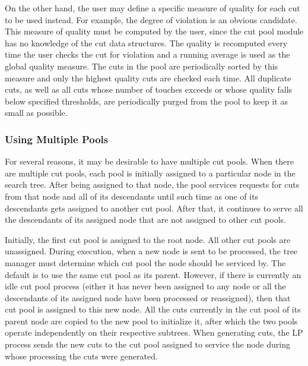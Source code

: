 On the other hand, the user may define a specific measure of quality for
each cut to be used instead. For example, the degree of
violation is an obvious candidate. This measure of quality must be
computed by the user, since the cut pool module has no knowledge of
the cut data structures. The quality is recomputed every time
the user checks the cut for violation and a running average is used as
the global quality measure. The cuts in the pool are periodically
sorted by this measure and only the highest quality cuts
are checked each time. All duplicate cuts, as well as all cuts whose
number of touches exceeds or whose quality falls below specified
thresholds, are periodically purged from the pool to keep it as small as
possible.

\subsubsection{Using Multiple Pools}
\label{multi-cut-pools}

For several reasons, it may be desirable to have multiple cut pools.
When there are multiple cut pools, each pool is initially assigned
to a particular node in the search tree. After being assigned to that
node, the pool services requests for cuts from that node and all
of its descendants until such time as one of its descendants gets
assigned to another cut pool. After that, it continues to
serve all the descendants of its assigned node that are not assigned
to other cut pools.

Initially, the first cut pool is assigned to the root
node. All other cut pools are unassigned. During execution, when a new
node is sent to be processed, the tree manager must determine
which cut pool the node should be serviced by. The default is to use
the same cut pool as its parent. However, if there is currently an
idle cut pool process (either it has never been assigned to any node
or all the descendants of its assigned node have been processed or
reassigned), then that cut pool is assigned to this new node. All the
cuts currently in the cut pool of its parent node are copied to the
new pool to initialize it, after which the two pools operate
independently on their respective subtrees. When generating cuts, the
LP process sends the new cuts to the cut pool assigned to
service the node during whose processing the cuts were generated.

